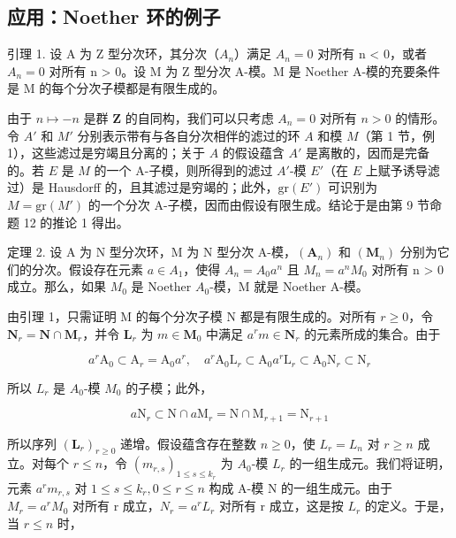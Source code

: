\subsection{应用：Noether 环的例子}

		引理 1. 设 A 为 Z 型分次环，其分次（\(A_{n}\)）满足 \(A_{n} = 0\) 对所有 n \textless{} 0，或者 \(A_{n} = 0\) 对所有 n \textgreater{} 0。设 M 为 Z 型分次 A-模。M 是 Noether A-模的充要条件是 M 的每个分次子模都是有限生成的。

	由于 \(n \mapsto -n\) 是群 \(\mathbf{Z}\) 的自同构，我们可以只考虑 \(A_n = 0\) 对所有 \(n > 0\) 的情形。令 \(A'\) 和 \(M'\) 分别表示带有与各自分次相伴的滤过的环 \(A\) 和模 \(M\)（第 1 节，例 1），这些滤过是穷竭且分离的；关于 \(A\) 的假设蕴含 \(A'\) 是离散的，因而是完备的。若 \(E\) 是 \(M\) 的一个 A-子模，则所得到的滤过 \(A'\)-模 \(E'\)（在 \(E\) 上赋予诱导滤过）是 Hausdorff 的，且其滤过是穷竭的；此外，\(\text{gr}(E')\) 可识别为 \(M = \text{gr}(M')\) 的一个分次 A-子模，因而由假设有限生成。结论于是由第 9 节命题 12 的推论 1 得出。

	定理 2. 设 A 为 N 型分次环，M 为 N 型分次 A-模，\((\mathbf{A}_{n})\) 和 \((\mathbf{M}_{n})\) 分别为它们的分次。假设存在元素 \(a \in A_{1}\)，使得 \(A_{n} = A_{0}a^{n}\) 且 \(M_{n} = a^{n}M_{0}\) 对所有 n \textgreater{} 0 成立。那么，如果 \(M_{0}\) 是 Noether \(A_{0}\)-模，M 就是 Noether A-模。

	由引理 1，只需证明 M 的每个分次子模 N 都是有限生成的。对所有 \(r \geqslant 0\)，令 \(\mathbf{N}_r = \mathbf{N} \cap \mathbf{M}_r\)，并令 \(\mathbf{L}_r\) 为 \(m \in \mathbf{M}_0\) 中满足 \(a^r m \in \mathbf{N}_r\) 的元素所成的集合。由于

\[
a ^ {r} \mathrm{A} _ {0} \subset \mathrm{A} _ {r} = \mathrm{A} _ {0} a ^ {r}, \quad a ^ {r} \mathrm{A} _ {0} \mathrm{L} _ {r} \subset \mathrm{A} _ {0} a ^ {r} \mathrm{L} _ {r} \subset \mathrm{A} _ {0} \mathrm{N} _ {r} \subset \mathrm{N} _ {r}
\]

	所以 \(L_{r}\) 是 \(A_{0}\)-模 \(M_{0}\) 的子模；此外，

\[
a \mathrm{N} _ {r} \subset \mathrm{N} \cap a \mathrm{M} _ {r} = \mathrm{N} \cap \mathrm{M} _ {r + 1} = \mathrm{N} _ {r + 1}
\]

	所以序列 \((\mathbf{L}_{r})_{r\geqslant0}\) 递增。假设蕴含存在整数 \(n\geqslant0\)，使 \(L_{r}=L_{n}\) 对 \(r\geqslant n\) 成立。对每个 \(r\leqslant n\)，令 \((m_{r,s})_{1\leqslant s\leqslant k_{r}}\) 为 \(A_{0}\)-模 \(L_{r}\) 的一组生成元。我们将证明，元素 \(a^{r}m_{r,s}\) 对 \(1\leqslant s\leqslant k_{r}, 0\leqslant r\leqslant n\) 构成 A-模 N 的一组生成元。由于 \(M_{r}=a^{r}M_{0}\) 对所有 r 成立，\(N_{r}=a^{r}L_{r}\) 对所有 r 成立，这是按 \(L_{r}\) 的定义。于是，当 \(r\leqslant n\) 时，

